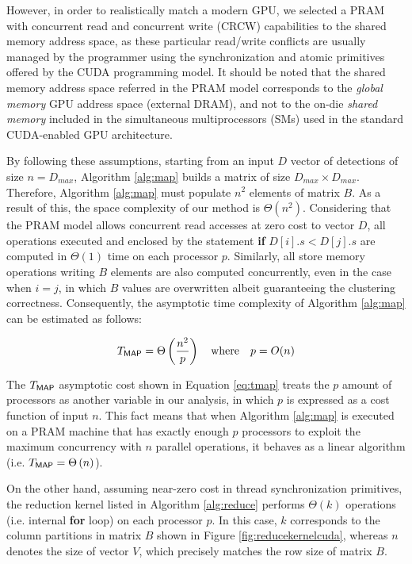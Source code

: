 However, in order to realistically match a modern GPU, we selected a PRAM with concurrent read and concurrent 
write (CRCW) capabilities to the shared memory address space, as these particular read/write conflicts are usually managed 
by the programmer using the synchronization and atomic primitives offered by the CUDA programming model. It should be 
noted that the shared memory address space referred in the PRAM model corresponds to the \emph{global memory} GPU address 
space (external DRAM), and not to the on-die \emph{shared memory} included in the simultaneous multiprocessors (SMs) used 
in the standard CUDA-enabled GPU architecture.

By following these assumptions, starting from an input $D$ vector of detections of size $n = D_{max}$, Algorithm \ref{alg:map} 
builds a matrix of size $D_{max} \times D_{max}$. Therefore, Algorithm \ref{alg:map} must populate $n^2$ elements of 
matrix $B$. As a result of this, the space complexity of our method is $\Theta(n^2)$. Considering that the PRAM model allows 
concurrent read accesses at zero cost to vector $D$, all operations executed and 
enclosed by the statement \textbf{if} $D[i].s < D[j].s$ are computed in $\Theta(1)$ time on each processor $p$. Similarly, 
all store memory operations writing $B$ elements are also computed concurrently, even in the case when $i = j$, in which 
$B$ values are overwritten albeit guaranteeing the clustering correctness. Consequently, the asymptotic time complexity of 
Algorithm \ref{alg:map} can be estimated as follows:

\begin{equation}
\label{eq:tmap}
T_{\tiny\textsf{MAP}\normalsize} = \Theta\left(\frac{n^{2}}{p}\right) \quad \textrm{where} \quad p = O(n)
\end{equation}

\bigbreak

The $T_{\tiny\textsf{MAP}\normalsize}$ asymptotic cost shown in Equation \ref{eq:tmap} treats the $p$ amount of 
processors as another variable in our analysis, in which $p$ is expressed as a cost function of input $n$. This fact means 
that when Algorithm \ref{alg:map} is executed on a PRAM machine that has exactly enough $p$ processors to exploit the 
maximum concurrency with $n$ parallel operations, it behaves as a linear algorithm (i.e. $T_{\tiny\textsf{MAP}\normalsize} = \Theta\left(n\right)$).

On the other hand, assuming near-zero cost in thread synchronization primitives, the reduction kernel listed in Algorithm 
\ref{alg:reduce} performs $\Theta(k)$ operations (i.e. internal \textbf{for} loop) on each processor $p$. In this case, $k$ 
corresponds to the column partitions in matrix $B$ shown in Figure \ref{fig:reducekernelcuda}, whereas $n$ denotes 
the size of vector $V$, which precisely matches the row size of matrix $B$.

